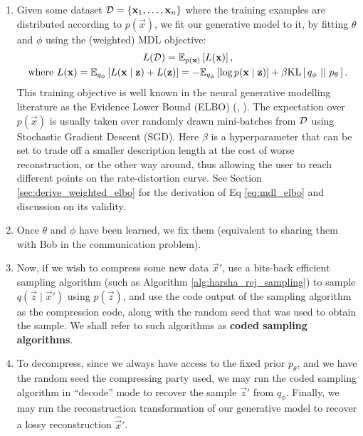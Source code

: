\begin{enumerate}
\item Given some dataset $\mathcal{D} = \{\mathbf{x}_1, \hdots, \mathbf{x}_n\}$ where the
  training examples are distributed according to $p(\vec{x})$, we fit our
  generative model to it, by fitting $\theta$ and $\phi$ using the (weighted) MDL
  objective:
  \begin{equation}
    \label{eq:mdl_elbo}
    \begin{gathered}
      L(\Data) = \Exp{L(\vec{x})}{p(\vec{x})}, \\
      \text{where } L(\vec{x}) = \Exp{L(\vec{x} \mid \vec{z}) + L(\vec{z})}{q_\phi}
      =  -\Exp{\log p(\vec{x} \mid \vec{z})}{q_\phi} + \beta\KL{q_\phi}{p_\theta}.
    \end{gathered}
  \end{equation}
  This training objective is well known in the neural generative modelling
  literature as the Evidence Lower Bound (ELBO) (\cite{kingma2013auto},
  \cite{higgins2017beta}). The expectation over $p(\vec{x})$ is usually taken over
  randomly drawn mini-batches from $\mathcal{D}$ using Stochastic Gradient Descent (SGD).
  Here $\beta$ is a
  hyperparameter that can be set to trade off a smaller description length at
  the cost of worse reconstruction, or the other way around, thus allowing the
  user to reach different points on the rate-distortion curve. See Section
  \ref{sec:derive_weighted_elbo} for the derivation of Eq \ref{eq:mdl_elbo} and
  discussion on its validity.

  \item Once $\theta$ and $\phi$ have been learned, we fix them (equivalent to
    sharing them with Bob in the communication problem).

  \item Now, if we wish to compress some new data $\vec{x}'$, use a bits-back
    efficient sampling algorithm (such as Algorithm
    \ref{alg:harsha_rej_sampling}) to sample $q(\vec{z} \mid \vec{x}')$ using
    $p(\vec{z})$, and use the code output of the sampling algorithm as the
    compression code, along with the random seed that was used to obtain the sample. 
    We shall refer to such algorithms as \textbf{coded sampling algorithms}.

  \item To decompress, since we always have access to the fixed prior
    $p_\theta$, and we have the random seed the compressing party used, we may
    run the coded sampling algorithm in ``decode'' mode to recover the sample $\vec{z}'$
    from $q_\phi$. Finally, we may run the reconstruction transformation of our
    generative model to recover a lossy reconstruction $\hat{\vec{x}}'$.
\end{enumerate}

